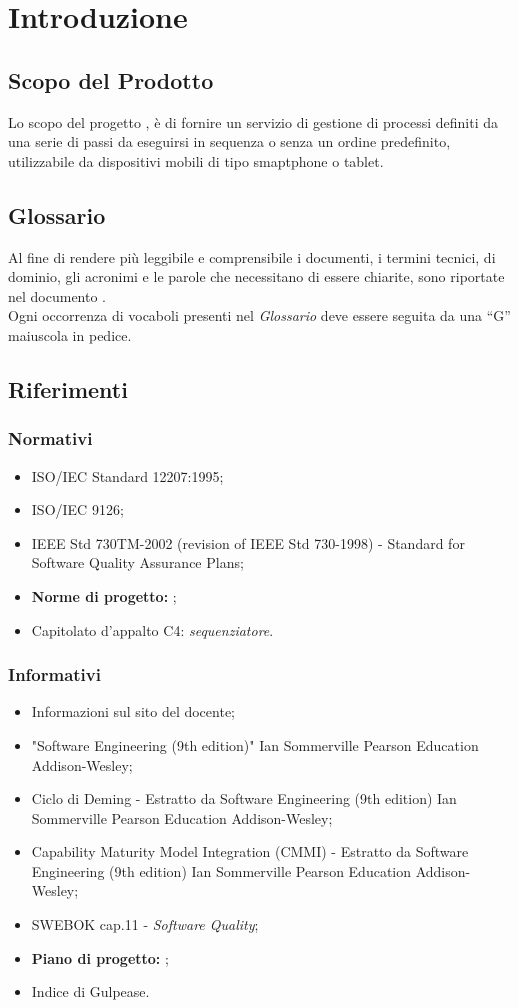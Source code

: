\section{Introduzione}
\subsection{Scopo del Prodotto}
Lo scopo del progetto \progetto{}, è di fornire un servizio di gestione di processi definiti da una serie di passi da eseguirsi in sequenza o senza un ordine predefinito, utilizzabile da dispositivi mobili di tipo smaptphone o tablet.
\subsection{Glossario}
Al fine di rendere più leggibile e comprensibile i documenti, i termini tecnici, di dominio, gli acronimi e le parole che necessitano di essere chiarite, sono riportate nel documento \Glossario{}.\\
Ogni occorrenza di vocaboli presenti nel \textit{Glossario} deve essere seguita da una ``G'' maiuscola in pedice.
\subsection{Riferimenti}
\subsubsection{Normativi}
\begin{itemize}
\item ISO/IEC Standard 12207:1995;
\item ISO/IEC 9126;
\item IEEE Std 730TM-2002 (revision of IEEE Std 730-1998) - Standard for Software Quality Assurance Plans;
\item \textbf{Norme di progetto:} \infoNDP ;
\item Capitolato d'appalto C4: \textit{sequenziatore}.
\end{itemize}
\subsubsection{Informativi}
\begin{itemize}
\item Informazioni sul sito del docente;
\item "Software Engineering (9th edition)" Ian Sommerville Pearson Education Addison-Wesley;
\item Ciclo di Deming - Estratto da Software Engineering (9th edition)
Ian Sommerville Pearson Education Addison-Wesley;
\item Capability Maturity Model Integration (CMMI) - Estratto da Software Engineering (9th edition)
Ian Sommerville Pearson Education Addison-Wesley;
\item SWEBOK cap.11 - \textit{Software Quality};
\item \textbf{Piano di progetto:} \infoPDP ;
\item Indice di Gulpease.
\end{itemize}
